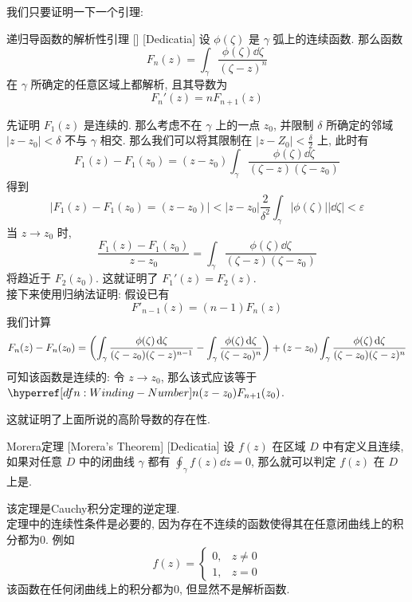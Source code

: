         我们只要证明一下一个引理: 

        \begin{thm}
            {递归导函数的解析性引理}
            []
            [Dedicatia]
            设 \(\phi(\zeta)\) 是 \(\gamma\) 弧上的连续函数. 那么函数
            \[F_n(z)=\int_\gamma \frac{\phi(\zeta)\dd{\zeta}}{(\zeta-z)^n}\]
            在 \(\gamma\) 所确定的任意区域上都解析, 且其导数为
            \[F_n'(z)=nF_{n+1}(z)\]
        \end{thm}

        \begin{prf}
            先证明 \(F_1(z)\) 是连续的. 那么考虑不在 \(\gamma\) 上的一点 \(z_0\), 并限制 \(\delta\) 所确定的邻域 \(|z-z_0|<\delta\) 不与 \(\gamma\) 相交. 那么我们可以将其限制在 \(|z-Z_0|<\frac{\delta}{2}\) 上, 此时有
            \[F_1(z)-F_1(z_0)=(z-z_0)\int_\gamma\frac{\phi(\zeta)\dd{\zeta}}{(\zeta-z)(\zeta-z_0)}\]
            得到
            \[|F_1(z)-F_1(z_0)=(z-z_0)|<|z-z_0|\frac{2}{\delta^2}\int_\gamma|\phi(\zeta)||\dd{\zeta}|<\varepsilon\]
            当 \(z\to z_0\) 时, 
            \[\frac{F_1(z)-F_1(z_0)}{z-z_0}=\int_\gamma\frac{\phi(\zeta)\dd{\zeta}}{(\zeta-z)(\zeta-z_0)}\]
            将趋近于 \(F_2(z_0)\). 这就证明了 \(F_1'(z)=F_2(z) \).\\
            接下来使用归纳法证明: 假设已有
            \[F'_{n-1}(z)=(n-1)F_n(z)\]
            我们计算
            \[F_n(z)-F_n(z_0)=\pqty{\int_\gamma\frac{\phi(\zeta)\dd{\zeta}}{(\zeta-z_0)(\zeta-z)^{n-1}}-\int_\gamma\frac{\phi(\zeta)\dd{\zeta}}{(\zeta-z_0)^n}}+(z-z_0)\int_\gamma\frac{\phi(\zeta)\dd{\zeta}}{(\zeta-z_0)(\zeta-z)^{n}}\]
            可知该函数是连续的: 令 \(z\to z_0\), 那么该式应该等于 \(\Windn(z-z_0)F_{n+1}(z_0)\).
        \end{prf}

        这就证明了上面所说的高阶导数的存在性. 

        \begin{thm}
            [Morera]
            {Morera定理}
            [Morera's Theorem]
            [Dedicatia]
            设 \(f(z)\) 在区域 \(D\) 中有定义且连续, 如果对任意 \(D\) 中的闭曲线 \(\gamma\) 都有 \(\oint_\gamma f(z)\dd{z}=0\), 那么就可以判定 \(f(z)\) 在 \(D\) 上是\Analytic{}.
        \end{thm}

        \begin{rmk}
            [Dedicatia]
            该定理是Cauchy积分定理的逆定理.\\
            定理中的连续性条件是必要的, 因为存在不连续的函数使得其在任意闭曲线上的积分都为0. 例如
            \[f(z)=\begin{cases}
                0,&z\neq 0\\
                1,&z=0
            \end{cases}\]
            该函数在任何闭曲线上的积分都为0, 但显然不是解析函数.
        \end{rmk}

